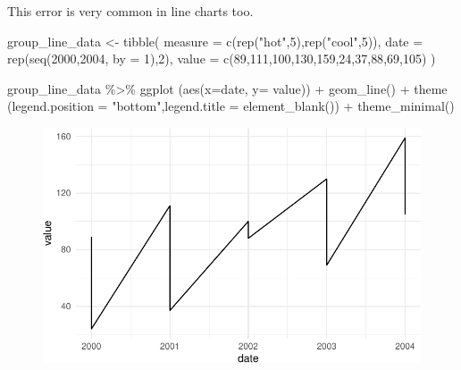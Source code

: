 \documentclass[
  letterpaper,
]{book}
\newenvironment{Shaded}{\begin{snugshade}}{\end{snugshade}}
\newcommand{\AttributeTok}[1]{\textcolor[rgb]{0.40,0.45,0.13}{#1}}
\newcommand{\DecValTok}[1]{\textcolor[rgb]{0.68,0.00,0.00}{#1}}
\newcommand{\FunctionTok}[1]{\textcolor[rgb]{0.28,0.35,0.67}{#1}}
\newcommand{\NormalTok}[1]{\textcolor[rgb]{0.00,0.23,0.31}{#1}}
\newcommand{\OtherTok}[1]{\textcolor[rgb]{0.00,0.23,0.31}{#1}}
\newcommand{\SpecialCharTok}[1]{\textcolor[rgb]{0.37,0.37,0.37}{#1}}
\newcommand{\StringTok}[1]{\textcolor[rgb]{0.13,0.47,0.30}{#1}}
\begin{document}
This error is very common in line charts too.

\begin{Shaded}
\begin{Highlighting}[]
\NormalTok{group\_line\_data }\OtherTok{\textless{}{-}} \FunctionTok{tibble}\NormalTok{(}
 \AttributeTok{measure =} \FunctionTok{c}\NormalTok{(}\FunctionTok{rep}\NormalTok{(}\StringTok{"hot"}\NormalTok{,}\DecValTok{5}\NormalTok{),}\FunctionTok{rep}\NormalTok{(}\StringTok{"cool"}\NormalTok{,}\DecValTok{5}\NormalTok{)),}
 \AttributeTok{date =} \FunctionTok{rep}\NormalTok{(}\FunctionTok{seq}\NormalTok{(}\DecValTok{2000}\NormalTok{,}\DecValTok{2004}\NormalTok{, }\AttributeTok{by =} \DecValTok{1}\NormalTok{),}\DecValTok{2}\NormalTok{),}
 \AttributeTok{value =} \FunctionTok{c}\NormalTok{(}\DecValTok{89}\NormalTok{,}\DecValTok{111}\NormalTok{,}\DecValTok{100}\NormalTok{,}\DecValTok{130}\NormalTok{,}\DecValTok{159}\NormalTok{,}\DecValTok{24}\NormalTok{,}\DecValTok{37}\NormalTok{,}\DecValTok{88}\NormalTok{,}\DecValTok{69}\NormalTok{,}\DecValTok{105}\NormalTok{)}
\NormalTok{) }
\end{Highlighting}
\end{Shaded}

\begin{Shaded}
\begin{Highlighting}[]
\NormalTok{group\_line\_data }\SpecialCharTok{\%\textgreater{}\%} \FunctionTok{ggplot}\NormalTok{ (}\FunctionTok{aes}\NormalTok{(}\AttributeTok{x=}\NormalTok{date, }\AttributeTok{y=}\NormalTok{ value)) }\SpecialCharTok{+} \FunctionTok{geom\_line}\NormalTok{() }\SpecialCharTok{+} \FunctionTok{theme}\NormalTok{ (}\AttributeTok{legend.position =} \StringTok{"bottom"}\NormalTok{,}\AttributeTok{legend.title =} \FunctionTok{element\_blank}\NormalTok{()) }\SpecialCharTok{+} \FunctionTok{theme\_minimal}\NormalTok{()}
\end{Highlighting}
\end{Shaded}

\begin{figure}[H]

{\centering \includegraphics{./data_viz_files/figure-pdf/unnamed-chunk-20-1.pdf}

}

\end{figure}
\end{document}
